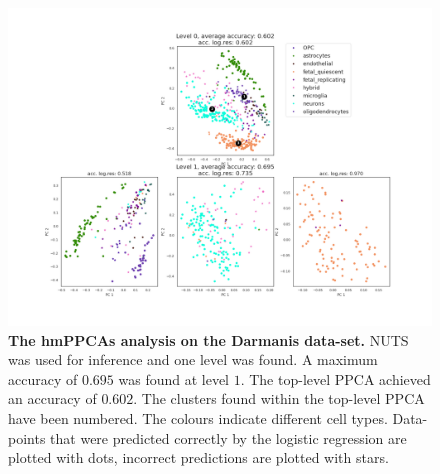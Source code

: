 


\begin{figure}
    \centering
    \includegraphics[width=\linewidth]{figs/Darmanis_tree_NUTS.png}
    \caption[The hmPPCAs analysis on the Darmanis data-set.]{\small \textbf{The hmPPCAs analysis on the Darmanis data-set.} \small NUTS was used for inference and one level was found. A maximum accuracy of $0.695$ was found at level $1$. The top-level PPCA achieved an accuracy of $0.602$. The clusters found within the top-level PPCA have been numbered. The colours indicate different cell types. Data-points that were predicted correctly by the logistic regression are plotted with dots, incorrect predictions are plotted with stars.}
    \label{fig:damanis_nuts}
\end{figure}

